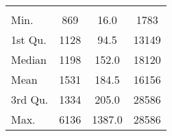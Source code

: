 \begin{tabular}{lS[table-format=5.1]S[table-format=5.1]S[table-format=5.1]}
&  &  &  \\
 Min.    & 869 & 16.0 & 1783 \\
 1st Qu. & 1128 & 94.5 & 13149 \\
 Median  & 1198 & 152.0 & 18120 \\
 Mean    & 1531 & 184.5 & 16156 \\
 3rd Qu. & 1334 & 205.0 & 28586 \\
 Max.    & 6136 & 1387.0 & 28586 \\
\end{tabular}
